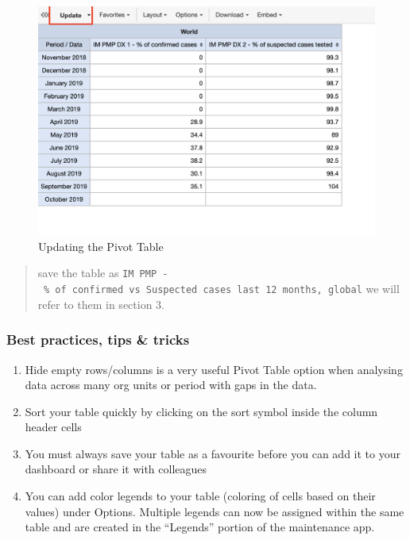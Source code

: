 \documentclass[]{book}
\providecommand{\tightlist}{%
  \setlength{\itemsep}{0pt}\setlength{\parskip}{0pt}}
\begin{document}
\begin{figure}
\includegraphics[width=16.67in]{./images/pivot-table3} \caption{Updating the Pivot Table}\label{fig:pivot-table3}
\end{figure}

\begin{quote}
save the table as \texttt{IM\ PMP\ -\ \%\ of\ confirmed\ vs\ Suspected\ cases\ last\ 12\ months,\ global} we will refer to them in section 3.
\end{quote}

\hypertarget{best-practices-tips-tricks}{%
\subsubsection{Best practices, tips \& tricks}\label{best-practices-tips-tricks}}

\begin{enumerate}
\def\labelenumi{\arabic{enumi}.}
\tightlist
\item
  Hide empty rows/columns is a very useful Pivot Table option when analysing data across many org units or period with gaps in the data.
\item
  Sort your table quickly by clicking on the sort symbol inside the column header cells
\item
  You must always save your table as a favourite before you can add it to your dashboard or share it with colleagues
\item
  You can add color legends to your table (coloring of cells based on their values) under Options. Multiple legends can now be assigned within the same table and are created in the ``Legends'' portion of the maintenance app.
\end{enumerate}
\end{document}
